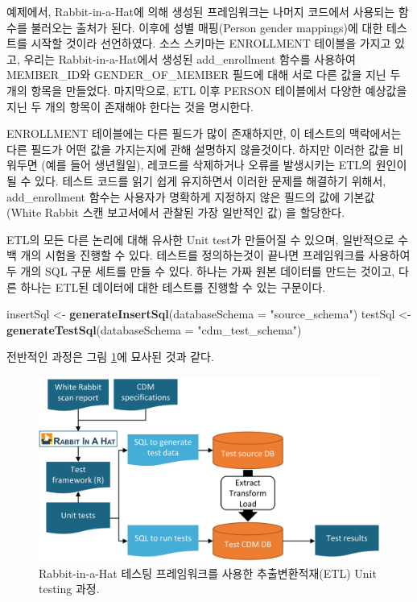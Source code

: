 \documentclass[11pt]{book}
\newenvironment{Shaded}{\begin{snugshade}}{\end{snugshade}}
\newcommand{\KeywordTok}[1]{\textcolor[rgb]{0.13,0.29,0.53}{\textbf{#1}}}
\newcommand{\DataTypeTok}[1]{\textcolor[rgb]{0.13,0.29,0.53}{#1}}
\newcommand{\StringTok}[1]{\textcolor[rgb]{0.31,0.60,0.02}{#1}}
\newcommand{\NormalTok}[1]{#1}
\theoremstyle{definition}
\theoremstyle{definition}
\theoremstyle{definition}
\theoremstyle{remark}
\begin{document}
예제에서, Rabbit-in-a-Hat에 의해 생성된 프레임워크는 나머지 코드에서
사용되는 함수를 불러오는 출처가 된다. 이후에 성별 매핑(Person gender
mappings)에 대한 테스트를 시작할 것이라 선언하였다. 소스 스키마는
ENROLLMENT 테이블을 가지고 있고, 우리는 Rabbit-in-a-Hat에서 생성된
add\_enrollment 함수를 사용하여 MEMBER\_ID와 GENDER\_OF\_MEMBER 필드에
대해 서로 다른 값을 지닌 두 개의 항목을 만들었다. 마지막으로, ETL 이후
PERSON 테이블에서 다양한 예상값을 지닌 두 개의 항목이 존재해야 한다는
것을 명시한다.

ENROLLMENT 테이블에는 다른 필드가 많이 존재하지만, 이 테스트의
맥락에서는 다른 필드가 어떤 값을 가지는지에 관해 설명하지 않을것이다.
하지만 이러한 값을 비워두면 (예를 들어 생년월일), 레코드를 삭제하거나
오류를 발생시키는 ETL의 원인이 될 수 있다. 테스트 코드를 읽기 쉽게
유지하면서 이러한 문제를 해결하기 위해서, add\_enrollment 함수는
사용자가 명확하게 지정하지 않은 필드의 값에 기본값 (White Rabbit 스캔
보고서에서 관찰된 가장 일반적인 값) 을 할당한다.

ETL의 모든 다른 논리에 대해 유사한 Unit test가 만들어질 수 있으며,
일반적으로 수백 개의 시험을 진행할 수 있다. 테스트를 정의하는것이 끝나면
프레임워크를 사용하여 두 개의 SQL 구문 세트를 만들 수 있다. 하나는 가짜
원본 데이터를 만드는 것이고, 다른 하나는 ETL된 데이터에 대한 테스트를
진행할 수 있는 구문이다.

\begin{Shaded}
\begin{Highlighting}[]
\NormalTok{insertSql <-}\StringTok{ }\KeywordTok{generateInsertSql}\NormalTok{(}\DataTypeTok{databaseSchema =} \StringTok{"source_schema"}\NormalTok{)}
\NormalTok{testSql <-}\StringTok{ }\KeywordTok{generateTestSql}\NormalTok{(}\DataTypeTok{databaseSchema =} \StringTok{"cdm_test_schema"}\NormalTok{)}
\end{Highlighting}
\end{Shaded}

전반적인 과정은 그림 \ref{fig:testFramework}에 묘사된 것과 같다.

\begin{figure}

{\centering \includegraphics[width=0.9\linewidth]{images/DataQuality/testFramework} 

}

\caption{Rabbit-in-a-Hat 테스팅 프레임워크를 사용한 추출변환적재(ETL) Unit testing 과정.}\label{fig:testFramework}
\end{figure}
\end{document}

